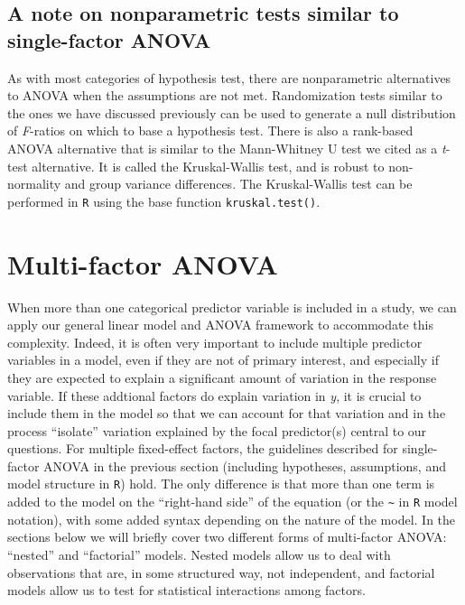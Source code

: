 \documentclass[]{book}
\begin{document}
\hypertarget{a-note-on-nonparametric-tests-similar-to-single-factor-anova}{%
\subsection{A note on nonparametric tests similar to single-factor ANOVA}\label{a-note-on-nonparametric-tests-similar-to-single-factor-anova}}

As with most categories of hypothesis test, there are nonparametric alternatives to ANOVA when the assumptions are not met. Randomization tests similar to the ones we have discussed previously can be used to generate a null distribution of \emph{F}-ratios on which to base a hypothesis test. There is also a rank-based ANOVA alternative that is similar to the Mann-Whitney U test we cited as a \emph{t}-test alternative. It is called the Kruskal-Wallis test, and is robust to non-normality and group variance differences. The Kruskal-Wallis test can be performed in \texttt{R} using the base function \texttt{kruskal.test()}.

\hypertarget{multi-factor-anova}{%
\section{Multi-factor ANOVA}\label{multi-factor-anova}}

When more than one categorical predictor variable is included in a study, we can apply our general linear model and ANOVA framework to accommodate this complexity. Indeed, it is often very important to include multiple predictor variables in a model, even if they are not of primary interest, and especially if they are expected to explain a significant amount of variation in the response variable. If these addtional factors do explain variation in \emph{y}, it is crucial to include them in the model so that we can account for that variation and in the process ``isolate'' variation explained by the focal predictor(s) central to our questions. For multiple fixed-effect factors, the guidelines described for single-factor ANOVA in the previous section (including hypotheses, assumptions, and model structure in \texttt{R}) hold. The only difference is that more than one term is added to the model on the ``right-hand side'' of the equation (or the \texttt{\textasciitilde{}} in \texttt{R} model notation), with some added syntax depending on the nature of the model. In the sections below we will briefly cover two different forms of multi-factor ANOVA: ``nested'' and ``factorial'' models. Nested models allow us to deal with observations that are, in some structured way, not independent, and factorial models allow us to test for statistical interactions among factors.
\end{document}
